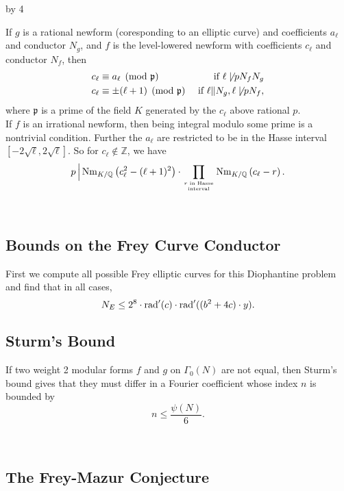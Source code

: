 \documentclass[12pt]{scrartcl}
\def\Q{{\mathbb Q}}
\def\Z{{\mathbb Z}}
\newcommand{\rad}{{\rm{rad}}}
\newcommand{\p}{\mathfrak{p}}
\newcommand{\Nm}{\operatorname{Nm}}
\def\anzspalten{4}
\newlength{\kastenwidth}
\newenvironment{kasten}{%
  \begin{lrbox}{\dummybox}%
    \begin{minipage}{0.96\linewidth}}%
    {\end{minipage}%
  \end{lrbox}%
  \raisebox{-\depth}{\psshadowbox[framesep=1em]{\usebox{\dummybox}}}\\[0.5em]}
\newenvironment{spalte}{%
  \setlength\kastenwidth{1.2\textwidth}
  \divide\kastenwidth by \anzspalten
  \begin{minipage}[t]{\kastenwidth}}{\end{minipage}\hfill}
\begin{document}
\begin{lrbox}{\spalten}
{\begin{spalte}
\begin{kasten}
If $g$ is a rational newform (coresponding to an elliptic curve) and coefficients $a_\ell$ and conductor $N_g$, and $f$ is the level-lowered newform with coefficients $c_\ell$ and conductor $N_f$, then
\begin{align*}
c_\ell &\equiv a_\ell \pmod{\p} & \text{ if $\ell \not\mid pN_fN_g$} \\
c_\ell &\equiv \pm(\ell+1) \pmod{\p} & \text{ if $\ell \| N_g, \ell \not\mid pN_f$},
\end{align*}
where $\p$ is a prime of the field $K$ generated by the $c_\ell$ above rational $p$. \\

If $f$ is an irrational newform, then being integral modulo some prime is a nontrivial condition.  Further the $a_\ell$ are restricted to be in the Hasse interval $[-2\sqrt{\ell}, 2\sqrt{\ell}]$.  So for $c_\ell \not\in \Z$, we have
\[ p\, \Big| \Nm_{K/\Q}\left(c_\ell^2 - (\ell+1)^2\right) \cdot \prod_{r \text{ in Hasse} \atop \text{interval}} \Nm_{K/\Q} \left( c_\ell - r \right). \]


\end{kasten}

\begin{kasten}

\subsection*{\color{blue} Bounds on the Frey Curve Conductor}

First we compute all possible Frey elliptic curves for this Diophantine problem and find that in all cases,
\[N_E \leq 2^8 \cdot \rad'(c) \cdot \rad'((b^2+4c)\cdot y).\]


\subsection*{\color{blue} Sturm's Bound}

If two weight 2 modular forms $f$ and $g$ on $\Gamma_0(N)$ are not equal, then Sturm's bound gives that they must differ in a Fourier coefficient whose index $n$ is bounded by 
\[n \leq \frac{\psi(N)}{6}.\] 

\end{kasten}

\begin{kasten}

\subsection*{ \color{blue} The Frey-Mazur Conjecture}


\end{kasten}
\end{spalte}}
\end{lrbox}
\end{document}
